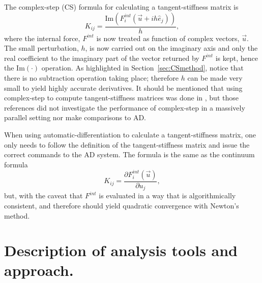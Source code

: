 \documentclass[preprint,12pt]{elsarticle}
\begin{document}
The complex-step (CS) formula for calculating a tangent-stiffness matrix is
%
\begin{equation} K_{ij} = \frac{\mbox{Im}(F_i^{int}(\vec{u} + i h
\hat{e}_j))}{h}, \end{equation}
%
where the internal force, $F^{int}$ is now treated as function of complex
vectors,  $\vec{u}$. The small perturbation, $h$, is now carried out on the
imaginary axis and only the real coefficient to the imaginary part of the
vector returned by $F^{int}$ is kept, hence the $\mbox{Im}(\cdot)$ operation.
As highlighted in Section~\ref{sec:CSmethod}, notice that there is no
subtraction operation taking place; therefore $h$ can be made very small to
yield highly accurate derivatives. It should be mentioned that using
complex-step to compute tangent-stiffness matrices was done in
\cite{perez2000numerical,perez2012numerical}, but those references did not
investigate the performance of complex-step in a massively parallel setting nor
make comparisons to AD. 

When using automatic-differentiation to calculate a tangent-stiffness matrix,
one only needs to follow the definition of the tangent-stiffness matrix and
issue the correct commands to the AD system. The formula is the same as the
continuum formula
%
\begin{equation} K_{ij} = \frac{\partial F_i^{int}(\vec{u})}{\partial u_j},
\end{equation}
%
but, with the caveat that $F^{int}$ is evaluated in a way that is
algorithmically consistent, and therefore should yield quadratic convergence
with Newton's method.

\section{Description of analysis tools and approach.} 
%
\end{document}
